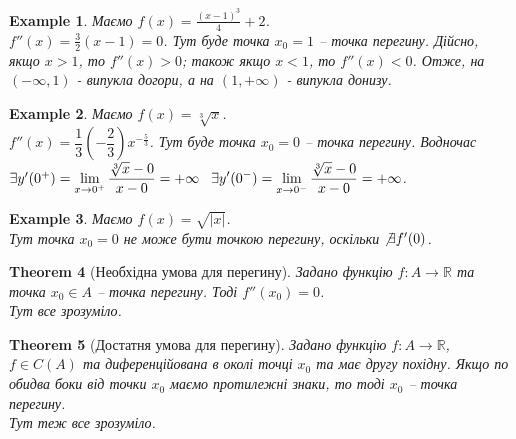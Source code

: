 \documentclass[a4paper, 14pt]{article}
\theoremstyle{theoremdd}
\newtheorem{theorem}{Theorem}[subsection]
\theoremstyle{theoremdd}
\theoremstyle{theoremdd}
\theoremstyle{theoremdd}
\newtheorem{example}[theorem]{Example}
\theoremstyle{theoremdd}
\theoremstyle{theoremdd}
\theoremstyle{theoremdd}
\theoremstyle{theoremdd}
\begin{document}
\begin{example}
Маємо $f(x) = \displaystyle \frac{(x-1)^3}{4} + 2$.\\
$f''(x) = \displaystyle \frac{3}{2}(x-1) = 0$. Тут буде точка $x_0 = 1$ -- точка перегину. Дійсно, якщо $x > 1$, то $f''(x) > 0$; також якщо $x < 1$, то $f''(x) < 0$. Отже, на $(-\infty,1)$ - випукла догори, а на $(1,+\infty)$ - випукла донизу.
\end{example}

\begin{example}
Маємо $f(x) = \sqrt[3]{x}$.\\
$f''(x) = \dfrac{1}{3} \left( -\dfrac{2}{3} \right) x^{-\frac{5}{3}}$. Тут буде точка $x_0 = 0$ -- точка перегину. Водночас \\ $\exists y'(0^+) = \displaystyle \lim_{x \to 0^+} \dfrac{\sqrt[3]{x} - 0}{x - 0} = +\infty \hspace{0.3cm} \exists y'(0^-) = \displaystyle \lim_{x \to 0^-} \dfrac{\sqrt[3]{x} - 0}{x - 0} = +\infty$.
\\ %
\end{example}

\begin{example}
Маємо $f(x) = \sqrt{|x|}$.\\
Тут точка $x_0 = 0$ не може бути точкою перегину, оскільки $\not \exists f'(0)$.
\end{example}


\begin{theorem}[Необхідна умова для перегину]
Задано функцію $f \colon A \to \mathbb{R}$ та точка $x_0 \in A$ -- точка перегину. Тоді $f''(x_0) = 0$.\\
\textit{Тут все зрозуміло.}
\end{theorem}

\begin{theorem}[Достатня умова для перегину]
Задано функцію $f \colon A \to \mathbb{R}$, $f \in C(A)$ та диференційована в околі точці $x_0$ та має другу похідну. Якщо по обидва боки від точки $x_0$ маємо протилежні знаки, то тоді $x_0$ -- точка перегину.\\
\textit{Тут теж все зрозуміло.}
\end{theorem}
\end{document}
